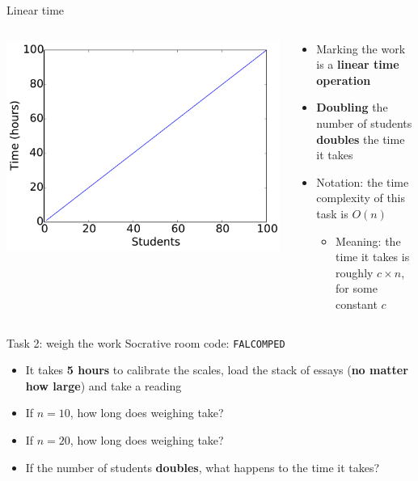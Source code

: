\begin{frame}{Linear time}
	\begin{columns}
		\begin{column}{0.47\textwidth}
			\includegraphics[width=\textwidth]{plot_linear}
		\end{column}
		\begin{column}{0.47\textwidth}
			\begin{itemize}
				\item Marking the work is a \textbf{linear time operation} \pause
				\item \textbf{Doubling} the number of students \textbf{doubles} the time it takes \pause
				\item Notation: the time complexity of this task is $O(n)$ \pause
				\begin{itemize}
					\item Meaning: the time it takes is roughly $c \times n$, for some constant $c$
				\end{itemize}
			\end{itemize}
		\end{column}
	\end{columns}
\end{frame}

\begin{frame}{Task 2: weigh the work}
	Socrative room code: \texttt{FALCOMPED}
	\begin{itemize}
		\item It takes \textbf{5 hours} to calibrate the scales,
			load the stack of essays (\textbf{no matter how large}) and take a reading \pause
		\item If $n=10$, how long does weighing take? \pause
		\item If $n=20$, how long does weighing take? \pause
		\item If the number of students \textbf{doubles}, what happens to the time it takes?
	\end{itemize}
\end{frame}

